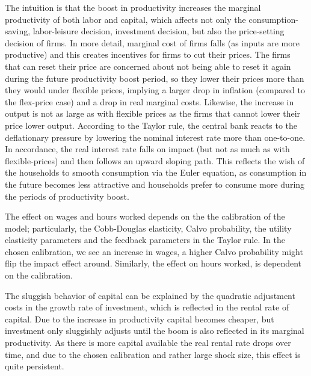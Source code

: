 \begin{enumerate}
The intuition is that the boost in productivity increases the marginal productivity of both labor and capital,
  which affects not only the consumption-saving, labor-leisure decision, investment decision,
  but also the price-setting decision of firms.
In more detail, marginal cost of firms falls (as inputs are more productive) and this creates incentives for firms to cut their prices.
The firms that can reset their price are concerned about not being able to reset it again during the future productivity boost period,
  so they lower their prices more than they would under flexible prices,
  implying a larger drop in inflation (compared to the flex-price case) and a drop in real marginal costs.
Likewise, the increase in output is not as large as with flexible prices as the firms that cannot lower their price lower output.
According to the Taylor rule, the central bank reacts to the deflationary pressure by lowering the nominal interest rate more than one-to-one.
In accordance, the real interest rate falls on impact (but not as much as with flexible-prices)
  and then follows an upward sloping path.
This reflects the wish of the households to smooth consumption via the Euler equation,
  as consumption in the future becomes less attractive and households prefer to consume more during the periods of productivity boost.

The effect on wages and hours worked depends on the the calibration of the model;
  particularly, the Cobb-Douglas elasticity, Calvo probability, the utility elasticity parameters and the feedback parameters in the Taylor rule.
In the chosen calibration, we see an increase in wages,  
  a higher Calvo probability might flip the impact effect around.
Similarly, the effect on hours worked, is dependent on the calibration.

The sluggish behavior of capital can be explained by the quadratic adjustment costs in the growth rate of investment,
  which is reflected in the rental rate of capital.
Due to the increase in productivity capital becomes cheaper,
  but investment only sluggishly adjusts until the boom is also reflected in its marginal productivity.
As there is more capital available the real rental rate drops over time,
  and due to the chosen calibration and rather large shock size, this effect is quite persistent.




\end{enumerate}
